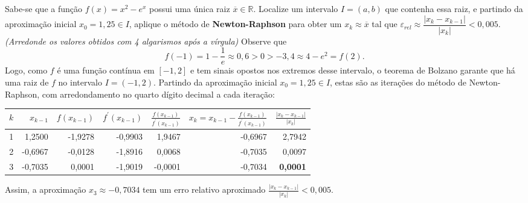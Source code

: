 \documentclass[12pt,a4paper]{article}
\newcommand*\R{\mathbb{R}}
\begin{document}
\begin{ExerciseList}
\Exercise[title={2,0}]
Sabe-se que a função $f(x) = x^2 - e^x$ possui uma única raiz $\overline{x} \in \R$. Localize um intervalo $I = (a, b)$ que contenha essa raiz, e partindo da aproximação inicial $x_0 = 1,25 \in I$, aplique o método de \textbf{Newton-Raphson} para obter um $x_k \approx \overline{x}$ tal que $\varepsilon_{rel} \approx \dfrac{|x_k - x_{k-1}|}{|x_k|} < 0,005$.
{\color{blue} \textit{(Arredonde os valores obtidos com 4 algarismos após a vírgula)}}
\Answer
Observe que
\[
  f(-1) = 1 - \frac{1}{e} \approx 0,6 > 0 > -3,4 \approx 4 - e^2 = f(2).
\]
Logo, como $f$ é uma função contínua em $[-1, 2]$ e tem sinais opostos nos extremos desse intervalo, o teorema de Bolzano garante que há uma raiz de $f$ no intervalo $I = (-1, 2)$. Partindo da aproximação inicial $x_0 = 1,25 \in I$, estas são as iterações do método de Newton-Raphson, com arredondamento no quarto dígito decimal a cada iteração:
\medskip
\begin{center}
\begin{tabular}{rrrrrrr}
\hline
  $k$
& $x_{k-1}$
& $f(x_{k-1})$
& $f^\prime(x_{k-1})$
& $\frac{f(x_{k-1})}{f^\prime(x_{k-1})}$
& $x_{k} = x_{k-1} - \frac{f(x_{k-1})}{f^\prime(x_{k-1})}$
& $\frac{|x_k - x_{k-1}|}{|x_k|}$ \\
\hline
1 &  1,2500 & -1,9278 & -0,9903 & 1,9467 & -0,6967 & 2,7942 \\
2 & -0,6967 & -0,0128 & -1,8916 & 0,0068 & -0,7035 & 0,0097 \\
3 & -0,7035 &  0,0001 & -1,9019 & -0,0001 & -0,7034 & \textbf{0,0001} \\
\hline
\end{tabular}
\end{center}
\medskip
Assim, a aproximação $x_3 \approx -0,7034$ tem um erro relativo aproximado $\frac{|x_k - x_{k-1}|}{|x_k|} < 0,005$.




\end{ExerciseList}
\end{document}

